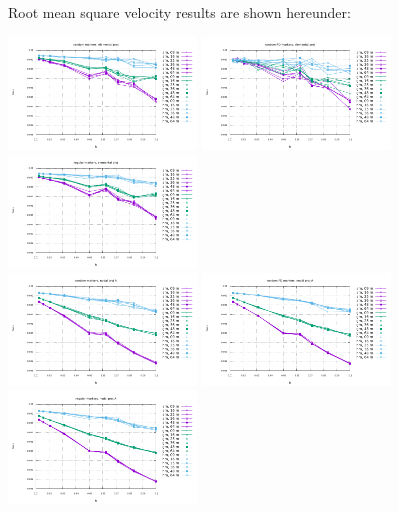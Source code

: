\newpage
Root mean square velocity results are shown hereunder:
\begin{center}
\includegraphics[width=5cm]{python_codes/fieldstone_13/vrms_rand_proj1} 
\includegraphics[width=5cm]{python_codes/fieldstone_13/vrms_poissondisc_proj1} 
\includegraphics[width=5cm]{python_codes/fieldstone_13/vrms_reg_proj1}\\ 
\includegraphics[width=5cm]{python_codes/fieldstone_13/vrms_rand_proj2} 
\includegraphics[width=5cm]{python_codes/fieldstone_13/vrms_poissondisc_proj2} 
\includegraphics[width=5cm]{python_codes/fieldstone_13/vrms_reg_proj2}\\ 

\end{center}
